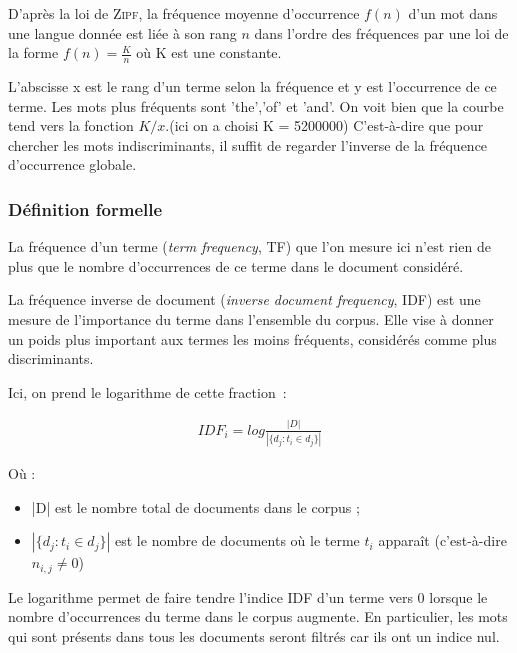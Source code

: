 \documentclass[a4paper, 12pt]{article}
\begin{document}
D'après la loi de \textsc{Zipf}, la fréquence moyenne d'occurrence $f(n)$ d'un mot dans une langue donnée est liée à son rang $n$ dans l'ordre des fréquences par une loi de la forme $f(n) = \frac{K}{n} $ où K est une constante.


L'abscisse x est le rang d'un terme selon la fréquence et y est l'occurrence de ce terme. Les mots plus fréquents sont 'the','of' et 'and'. On voit bien que la courbe tend vers la fonction $K/x$.(ici on a choisi K = 5200000) C'est-à-dire que pour chercher les mots indiscriminants, il suffit de regarder l'inverse de la fréquence d'occurrence globale.

\subsubsection{Définition formelle}

\begin{definition}[TF]
 La fréquence d'un terme (\textit{term frequency}, TF) que l'on mesure ici n'est rien de plus que le nombre d'occurrences de ce terme dans le document considéré.
\end{definition}

\begin{definition}[IDF]
 La fréquence inverse de document (\textit{inverse document frequency}, IDF) est une mesure de l'importance du terme dans l'ensemble du corpus. Elle vise à donner un poids plus important aux termes les moins fréquents, considérés comme plus discriminants.
\end{definition}

Ici, on prend le logarithme de cette fraction~:

\begin{align}
 IDF_{i} =  log \frac{|D|}{|\{d_{j}: t_{i} \in d_{j}\}|}
\end{align}

Où :
\begin{itemize}
 \item |D| est le nombre total de documents dans le corpus ;
 \item $|\{d_{j} : t_{i} \in d_{j}\}|$ est le nombre de documents où le terme  $t_{i}$  apparaît (c'est-à-dire  $n_{i,j} \neq 0$)
\end{itemize}
Le logarithme permet de faire tendre l'indice IDF d'un terme vers 0 lorsque le nombre d'occurrences du terme dans le corpus augmente. En particulier, les mots qui sont présents dans tous les documents seront filtrés car ils ont un indice nul.
\end{document}
